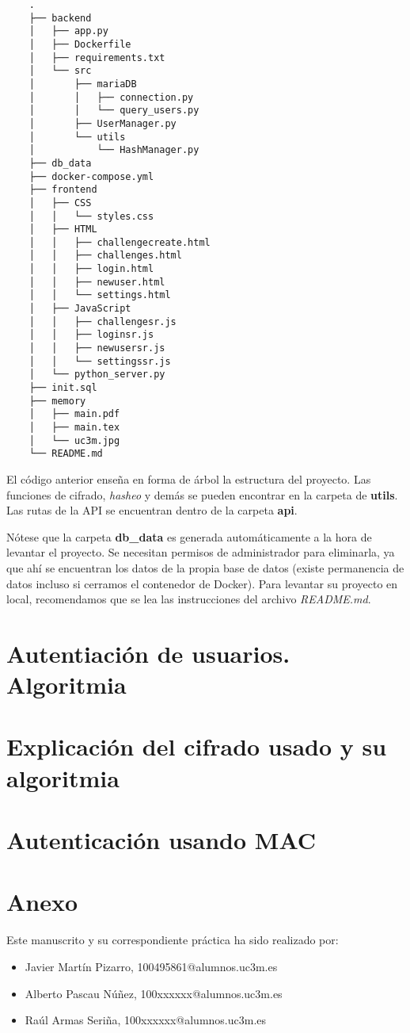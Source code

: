 \documentclass[a4paper,11pt]{report}
\begin{document}
\begin{verbatim}
    .
    ├── backend
    │   ├── app.py
    │   ├── Dockerfile
    │   ├── requirements.txt
    │   └── src
    │       ├── mariaDB
    │       │   ├── connection.py
    │       │   └── query_users.py
    │       ├── UserManager.py
    │       └── utils
    │           └── HashManager.py
    ├── db_data
    ├── docker-compose.yml
    ├── frontend
    │   ├── CSS
    │   │   └── styles.css
    │   ├── HTML
    │   │   ├── challengecreate.html
    │   │   ├── challenges.html
    │   │   ├── login.html
    │   │   ├── newuser.html
    │   │   └── settings.html
    │   ├── JavaScript
    │   │   ├── challengesr.js
    │   │   ├── loginsr.js
    │   │   ├── newusersr.js
    │   │   └── settingssr.js
    │   └── python_server.py
    ├── init.sql
    ├── memory
    │   ├── main.pdf
    │   ├── main.tex
    │   └── uc3m.jpg
    └── README.md
    \end{verbatim}

El código anterior enseña en forma de árbol la estructura del proyecto. Las funciones de cifrado, \textit{hasheo} y demás se pueden encontrar en la carpeta de \textbf{utils}. Las rutas de la API se encuentran dentro de la carpeta \textbf{api}.

Nótese que la carpeta \textbf{db\_data} es generada automáticamente a la hora de levantar el proyecto. Se necesitan permisos de administrador para eliminarla, ya que ahí se encuentran los datos de la propia base de datos (existe permanencia de datos incluso si cerramos el contenedor de Docker). Para levantar su proyecto en local, recomendamos que se lea las instrucciones del archivo \textit{README.md}.
    
\section{Autentiación de usuarios. Algoritmia}

\section{Explicación del cifrado usado y su algoritmia}

\section{Autenticación usando MAC}

\section{Anexo}
Este manuscrito y su correspondiente práctica ha sido realizado por:
\begin{itemize}
    \item Javier Martín Pizarro, 100495861@alumnos.uc3m.es
    \item Alberto Pascau Núñez, 100xxxxxx@alumnos.uc3m.es
    \item Raúl Armas Seriña, 100xxxxxx@alumnos.uc3m.es
\end{itemize}
\end{document}
